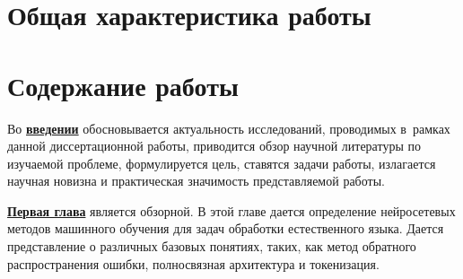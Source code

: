 \section*{Общая характеристика работы}

\newcommand{\actuality}{\underline{\textbf{\actualityTXT}}}
\newcommand{\progress}{\underline{\textbf{\progressTXT}}}
\newcommand{\aim}{\underline{{\textbf\aimTXT}}}
\newcommand{\tasks}{\underline{\textbf{\tasksTXT}}}
\newcommand{\novelty}{\underline{\textbf{\noveltyTXT}}}
\newcommand{\appropriation}{\underline{\textbf{\appropriationTXT}}}
\newcommand{\influence}{\underline{\textbf{\influenceTXT}}}
\newcommand{\methods}{\underline{\textbf{\methodsTXT}}}
\newcommand{\defpositions}{\underline{\textbf{\defpositionsTXT}}}
\newcommand{\reliability}{\underline{\textbf{\reliabilityTXT}}}
\newcommand{\probation}{\underline{\textbf{\probationTXT}}}
\newcommand{\contribution}{\underline{\textbf{\contributionTXT}}}
\newcommand{\publications}{\underline{\textbf{\publicationsTXT}}}



\section*{Содержание работы}
Во \underline{\textbf{введении}} обосновывается актуальность
исследований, проводимых в~рамках данной диссертационной работы,
приводится обзор научной литературы по изучаемой проблеме,
формулируется цель, ставятся задачи работы, излагается научная новизна
и практическая значимость представляемой работы. 

\underline{\textbf{Первая глава}} является обзорной. В этой главе дается определение нейросетевых методов машинного обучения для задач обработки естественного языка. Дается представление о различных базовых понятиях, таких, как метод обратного распространения ошибки, полносвязная архитектура и токенизация. 

